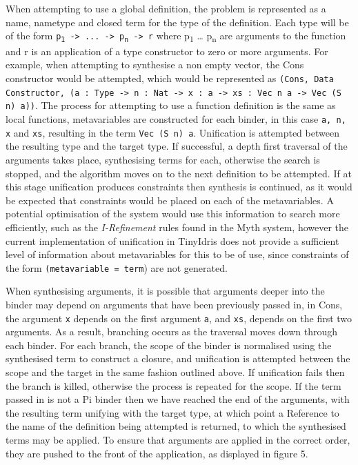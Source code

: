 \documentclass[a4paper]{article}
\begin{document}
When attempting to use a global definition, the problem is represented as a
name, nametype and closed term for the type of the definition. Each type will be of the form
\texttt{p\textsubscript{1} -> ... -> p\textsubscript{n} -> r} where p\textsubscript{1} \ldots{} p\textsubscript{n} are 
arguments to the function and r is an application of a type constructor
to zero or more arguments. For example, when attempting to synthesise a non empty vector,
the Cons constructor would be attempted, which would be represented as
\texttt{(Cons, Data Constructor, (a : Type -> n : Nat -> x : a -> xs : Vec n a -> Vec (S n) a))}.
The process for attempting to use a function definition is the same as local functions,
metavariables are constructed for each binder, in this case \texttt{a, n, x} and \texttt{xs},
resulting in the term \texttt{Vec (S n) a}.
Unification is attempted between the resulting type and the target type. If 
successful, a depth first traversal of the arguments takes place, synthesising terms for 
each, otherwise the search is stopped, and the algorithm
moves on to the next definition to be attempted. If at this stage unification
produces constraints then synthesis is continued, as it would be expected that
constraints would be placed on each of the metavariables. A potential optimisation of
the system would use this information to search more efficiently, such as the \textit{I-Refinement}
rules found in the Myth system, however the current implementation of unification in 
TinyIdris does not provide a sufficient level of information about metavariables for this to
be of use, since constraints of the form \texttt{(metavariable = term}) are not generated. 

When synthesising arguments, it is possible that arguments deeper into the binder
may depend on arguments that have been previously passed in, in Cons, the argument \texttt{x}
depends on the first argument \texttt{a}, and \texttt{xs}, depends on the first two arguments.
As a result, branching occurs as the traversal moves down through each binder. For each branch, the scope of the binder
is normalised using the synthesised term to construct a closure, and unification is 
attempted between the scope and the target in the same fashion outlined above. 
If unification fails then the branch is killed, otherwise the process is repeated for the 
scope. If the term passed in is not a Pi binder then we have reached the end of the 
arguments, with the resulting term unifying with the target type, at which point a
Reference to the name of the definition being attempted is returned, to which the synthesised terms may be applied. To ensure that arguments
are applied in the correct order, they are pushed to the front of
the application, as displayed in figure 5.
\end{document}
